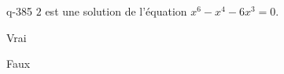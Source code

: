 \begin{truefalse}{q-385}
$2$ est une solution de l'équation $x^6-x^4-6x^3=0$.
\item* Vrai
\item Faux
\end{truefalse}


